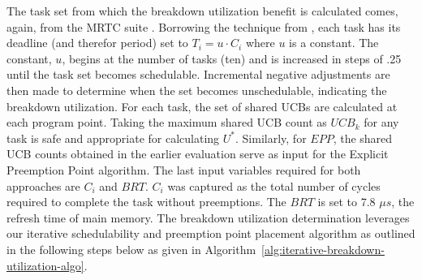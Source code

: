 %
The task set from which the breakdown utilization benefit is
calculated comes, again, from the MRTC suite \cite{mrtc:01}. Borrowing
the technique from \cite{lunniss:13}, each task has its deadline (and
therefor period) set to ${T_i = u \cdot C_i}$
where ${u}$ is a constant. The constant, ${u}$, begins at the number
of tasks (ten) and is increased in steps of .25 until the task set
becomes schedulable. Incremental negative adjustments are then made to
determine when the set becomes unschedulable, indicating the breakdown
utilization.
%
For each task, the set of shared UCBs are calculated at each program
point. Taking the maximum shared UCB count as ${UCB_k}$ for any task
is safe and appropriate for calculating ${U^*}$. Similarly, for ${EPP}$,
the shared UCB counts obtained in the earlier evaluation serve as input for
the Explicit Preemption Point algorithm.  The last input variables required
for both approaches are ${C_i}$ and ${BRT}$. ${C_i}$ was captured as the
total number of cycles required to complete the task without preemptions.
The ${BRT}$ is set to 7.8 ${{\mu}s}$, the refresh time of main memory.
%
The breakdown utilization determination leverages our iterative schedulability
and preemption point placement algorithm as outlined in the following steps below
as given in Algorithm~\ref{alg:iterative-breakdown-utilization-algo}.
